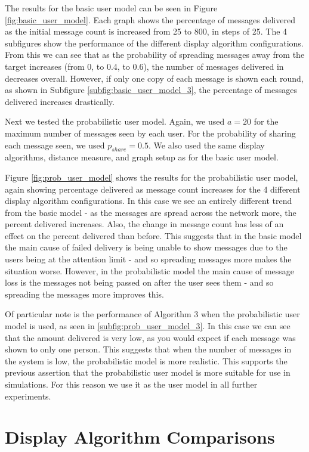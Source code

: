 \documentclass[bsc,frontabs,twoside,singlespacing,parskip,deptreport]{infthesis}     %
\begin{document}
The results for the basic user model can be seen in Figure \ref{fig:basic_user_model}. Each graph shows the percentage of messages delivered as the initial message count is increased from 25 to 800, in steps of 25. The 4 subfigures show the performance of the different display algorithm configurations. From this we can see that as the probability of spreading messages away from the target increases (from 0, to 0.4, to 0.6), the number of messages delivered in decreases overall. However, if only one copy of each message is shown each round, as shown in Subfigure \ref{subfig:basic_user_model_3}, the percentage of messages delivered increases drastically.

Next we tested the probabilistic user model. Again, we used $a=20$ for the maximum number of messages seen by each user. For the probability of sharing each message seen, we used $p_{share}=0.5$. We also used the same display algorithms, distance measure, and graph setup as for the basic user model.

Figure \ref{fig:prob_user_model} shows the results for the probabilistic user model, again showing percentage delivered as message count increases for the 4 different display algorithm configurations. In this case we see an entirely different trend from the basic model - as the messages are spread across the network more, the percent delivered increases. Also, the change in message count has less of an effect on the percent delivered than before. This suggests that in the basic model the main cause of failed delivery is being unable to show messages due to the users being at the attention limit - and so spreading messages more makes the situation worse. However, in the probabilistic model the main cause of message loss is the messages not being passed on after the user sees them - and so spreading the messages more improves this.

Of particular note is the performance of Algorithm 3 when the probabilistic user model is used, as seen in \ref{subfig:prob_user_model_3}. In this case we can see that the amount delivered is very low, as you would expect if each message was shown to only one person. This suggests that when the number of messages in the system is low, the probabilistic model is more realistic. This supports the previous assertion that the probabilistic user model is more suitable for use in simulations. For this reason we use it as the user model in all further experiments.

\section{Display Algorithm Comparisons} \label{sec:display_alg_comparisons}
\end{document}
